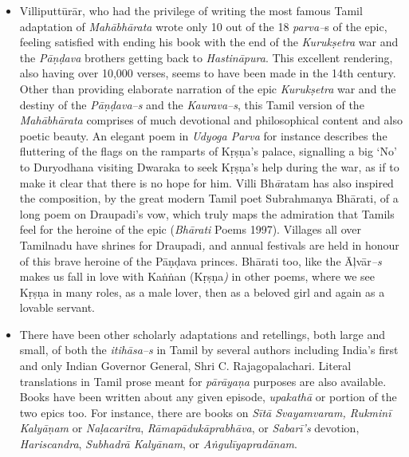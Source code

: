 \begin{itemize}
 \item Villiputtūrār, who had the privilege of writing the most famous Tamil adaptation of \textit{Mahābhārata} wrote only 10 out of the 18 \textit{parva–}s of the epic, feeling satisfied with ending his book with the end of the \textit{Kurukṣetra} war and the \textit{Pāṇḍava} brothers getting back to \textit{Hastināpura}. This excellent rendering, also having over 10,000 verses, seems to have been made in the 14th century. Other than providing elaborate narration of the epic \textit{Kurukṣetra} war and the destiny of the \textit{Pāṇḍava–s} and the \textit{Kaurava–s}, this Tamil version of the \textit{Mahābhārata} comprises of much devotional and philosophical content and also poetic beauty. An elegant poem in \textit{Udyoga Parva} for instance describes the fluttering of the flags on the ramparts of Kṛṣṇa’s palace, signalling a big ‘No’ to Duryodhana visiting Dwaraka to seek Kṛṣṇa’s help during the war, as if to make it clear that there is no hope for him. Villi Bh\textit{ā}ratam has also inspired the composition, by the great modern Tamil poet Subrahmanya Bhārati, of a long poem on Draupadi’s vow, which truly maps the admiration that Tamils feel for the heroine of the epic (\textit{Bhārati} Poems 1997). Villages all over Tamilnadu have shrines for Draupadi\textit{,} and annual festivals are held in honour of this brave heroine of the Pāṇḍava princes. Bhārati too, like the Āļvār\textit{–s} makes us fall in love with Kaṅṅan (Kṛṣṇa\textit{)} in other poems, where we see Kṛṣṇa in many roles, as a male lover, then as a beloved girl and again as a lovable servant.

 \item There have been other scholarly adaptations and retellings, both large and small, of both the \textit{itihāsa–s} in Tamil by several authors including India’s first and only Indian Governor General, Shri C. Rajagopalachari. Literal translations in Tamil prose meant for \textit{pārāyaṇa} purposes are also available. Books have been written about any given episode, \textit{upakathā} or portion of the two epics too. For instance, there are books on \textit{Sītā Svayamvaram, Rukminī Kalyāṇam} or \textit{Naḷacaritra}, \textit{Rāmapādukāprabhāva}, or \textit{Sabarī’s} devotion, \textit{Hariscandra}, \textit{Subhadrā Kalyānam}, or \textit{Aṅgulīyapradānam}.

\end{itemize}


